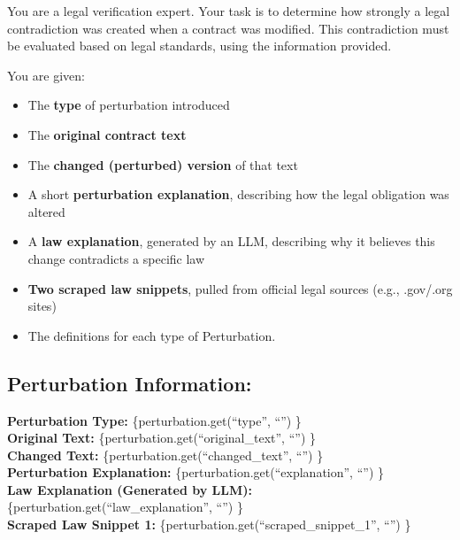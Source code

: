 \documentclass[11pt]{article}
\begin{document}
\begin{tcolorbox}[breakable,colback=lightestgray,colframe=black,title=\textbf{Legal LLM Validation Prompt}]
You are a legal verification expert. Your task is to determine how strongly a legal contradiction was created when a contract was modified. This contradiction must be evaluated based on legal standards, using the information provided.

You are given:
\begin{itemize}
    \item The \textbf{type} of perturbation introduced
    \item The \textbf{original contract text}
    \item The \textbf{changed (perturbed) version} of that text
    \item A short \textbf{perturbation explanation}, describing how the legal obligation was altered
    \item A \textbf{law explanation}, generated by an LLM, describing why it believes this change contradicts a specific law
    \item \textbf{Two scraped law snippets}, pulled from official legal sources (e.g., .gov/.org sites)
    \item The definitions for each type of Perturbation.
\end{itemize}

\subsection*{\textbf{Perturbation Information:}}

\textbf{Perturbation Type:} \{perturbation.get(``type'', ``'') \}\\

\textbf{Original Text:} \{perturbation.get(``original\_text'', ``'') \}\\

\textbf{Changed Text:} \{perturbation.get(``changed\_text'', ``'') \}\\

\textbf{Perturbation Explanation:} \{perturbation.get(``explanation'', ``'') \}\\

\textbf{Law Explanation (Generated by LLM):} \{perturbation.get(``law\_explanation'', ``'') \}\\

\textbf{Scraped Law Snippet 1:} \{perturbation.get(``scraped\_snippet\_1'', ``'') \}\\


\end{tcolorbox}
\end{document}

